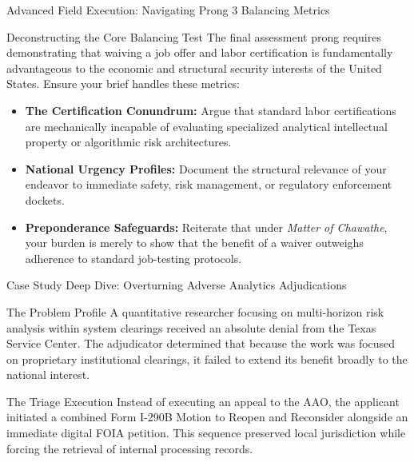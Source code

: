 \documentclass[11pt]{beamer}
\begin{document}
	\begin{frame}{Advanced Field Execution: Navigating Prong 3 Balancing Metrics}
		\scriptsize
		\begin{block}{Deconstructing the Core Balancing Test}
			The final assessment prong requires demonstrating that waiving a job offer and labor certification is fundamentally advantageous to the economic and structural security interests of the United States. Ensure your brief handles these metrics:
			\begin{itemize}
				\item \textbf{The Certification Conundrum:} Argue that standard labor certifications are mechanically incapable of evaluating specialized analytical intellectual property or algorithmic risk architectures.
				\item \textbf{National Urgency Profiles:} Document the structural relevance of your endeavor to immediate safety, risk management, or regulatory enforcement dockets.
				\item \textbf{Preponderance Safeguards:} Reiterate that under \textit{Matter of Chawathe}, your burden is merely to show that the benefit of a waiver outweighs adherence to standard job-testing protocols.
			\end{itemize}
		\end{block}
	\end{frame}
	
	\begin{frame}{Case Study Deep Dive: Overturning Adverse Analytics Adjudications}
		\scriptsize
		\begin{block}{The Problem Profile}
			A quantitative researcher focusing on multi-horizon risk analysis within system clearings received an absolute denial from the Texas Service Center. The adjudicator determined that because the work was focused on proprietary institutional clearings, it failed to extend its benefit broadly to the national interest.
		\end{block}
		\begin{block}{The Triage Execution}
			Instead of executing an appeal to the AAO, the applicant initiated a combined Form I-290B Motion to Reopen and Reconsider alongside an immediate digital FOIA petition. This sequence preserved local jurisdiction while forcing the retrieval of internal processing records.
		\end{block}
	\end{frame}
	
\end{document}

